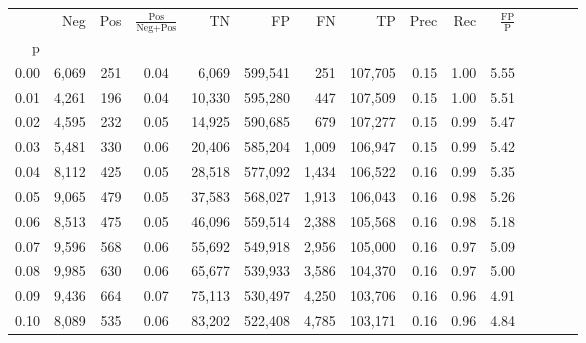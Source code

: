\begin{tabular}{rrrcrrrrrrrrrrr}
\toprule
{} &     Neg &    Pos & $\frac{\text{Pos}}{\text{Neg}+\text{Pos}}$ &       TN &       FP &       FN &       TP &  Prec &   Rec & $\frac{\text{FP}}{\text{P}}$ \\
p    &         &        &                                            &          &          &          &          &       &       &                              \\
\midrule
0.00 &   6,069 &    251 &                                       0.04 &    6,069 &  599,541 &      251 &  107,705 &  0.15 &  1.00 &                         5.55 \\
0.01 &   4,261 &    196 &                                       0.04 &   10,330 &  595,280 &      447 &  107,509 &  0.15 &  1.00 &                         5.51 \\
0.02 &   4,595 &    232 &                                       0.05 &   14,925 &  590,685 &      679 &  107,277 &  0.15 &  0.99 &                         5.47 \\
0.03 &   5,481 &    330 &                                       0.06 &   20,406 &  585,204 &    1,009 &  106,947 &  0.15 &  0.99 &                         5.42 \\
0.04 &   8,112 &    425 &                                       0.05 &   28,518 &  577,092 &    1,434 &  106,522 &  0.16 &  0.99 &                         5.35 \\
0.05 &   9,065 &    479 &                                       0.05 &   37,583 &  568,027 &    1,913 &  106,043 &  0.16 &  0.98 &                         5.26 \\
0.06 &   8,513 &    475 &                                       0.05 &   46,096 &  559,514 &    2,388 &  105,568 &  0.16 &  0.98 &                         5.18 \\
0.07 &   9,596 &    568 &                                       0.06 &   55,692 &  549,918 &    2,956 &  105,000 &  0.16 &  0.97 &                         5.09 \\
0.08 &   9,985 &    630 &                                       0.06 &   65,677 &  539,933 &    3,586 &  104,370 &  0.16 &  0.97 &                         5.00 \\
0.09 &   9,436 &    664 &                                       0.07 &   75,113 &  530,497 &    4,250 &  103,706 &  0.16 &  0.96 &                         4.91 \\
0.10 &   8,089 &    535 &                                       0.06 &   83,202 &  522,408 &    4,785 &  103,171 &  0.16 &  0.96 &                         4.84 \\

\end{tabular}
